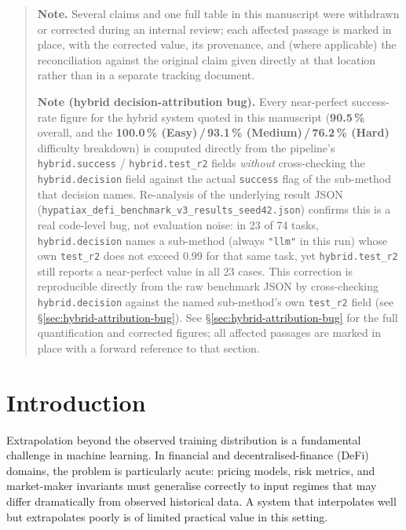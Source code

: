 \documentclass[twoside,11pt]{article}
\begin{document}
\begin{quote}\small
\textbf{Note.} Several claims and one full table in this manuscript were
withdrawn or corrected during an internal review; each affected passage is
marked in place, with the corrected value, its provenance, and (where
applicable) the reconciliation against the original claim given directly
at that location rather than in a separate tracking document.

\medskip
\noindent\textbf{Note (hybrid decision-attribution bug).} Every
near-perfect success-rate figure for the hybrid system quoted in this
manuscript (\textbf{90.5\,\%} overall, and the \textbf{100.0\,\%
(Easy)\,/\,93.1\,\% (Medium)\,/\,76.2\,\% (Hard)} difficulty
breakdown) is computed directly from the pipeline's \texttt{hybrid.success}
/ \texttt{hybrid.test\_r2} fields \emph{without} cross-checking the
\texttt{hybrid.decision} field against the actual \texttt{success} flag of
the sub-method that decision names. Re-analysis of the underlying result
JSON (\texttt{hypatiax\_defi\_benchmark\_v3\_results\_seed42.json}) confirms
this is a real code-level bug, not evaluation noise: in 23 of 74 tasks,
\texttt{hybrid.decision} names a sub-method (always \texttt{"llm"} in this
run) whose own \texttt{test\_r2} does not exceed 0.99 for that same task,
yet \texttt{hybrid.test\_r2} still reports a near-perfect value in all 23
cases. This correction is reproducible directly from the raw benchmark JSON
by cross-checking \texttt{hybrid.decision} against the named sub-method's
own \texttt{test\_r2} field (see \S\ref{sec:hybrid-attribution-bug}).
See \S\ref{sec:hybrid-attribution-bug} for the full quantification
and corrected figures; all affected passages are marked in place with a
forward reference to that section.
\end{quote}


\tableofcontents
\newpage

\section{Introduction}
\label{sec:intro}

Extrapolation beyond the observed training distribution is a fundamental challenge
in machine learning.  In financial and decentralised-finance (DeFi) domains, the
problem is particularly acute: pricing models, risk metrics, and market-maker
invariants must generalise correctly to input regimes that may differ dramatically
from observed historical data.  A system that interpolates well but extrapolates
poorly is of limited practical value in this setting.
\end{document}
